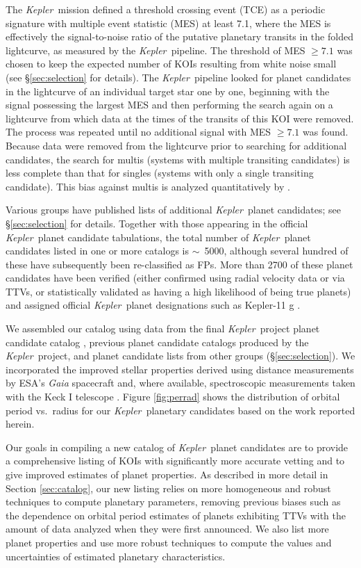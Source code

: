 \documentclass{aastex62}
\newcommand{\ik}{{\it Kepler~}}
\begin{document}
The \ik mission defined a threshold crossing event (TCE) as a periodic signature with multiple event statistic (MES) at least 7.1, where the MES is effectively the signal-to-noise ratio of the putative planetary transits in the folded lightcurve, as measured by the \ik pipeline. The threshold of MES $\geq 7.1$ was chosen to keep the expected number of KOIs resulting from white noise small (see \S\ref{sec:selection} for details). The \ik pipeline looked for planet candidates in the lightcurve of an individual target star one by one, beginning with the signal possessing the largest MES and then performing the search again on a lightcurve from which data at the times of the transits of this KOI were removed. The process was repeated until no additional signal with MES $\geq 7.1$ was found. Because data were removed from the lightcurve prior to searching for additional candidates, the search for multis (systems with multiple transiting candidates) is less complete than that for singles (systems with only a single transiting candidate). This bias against multis is analyzed quantitatively by \cite{Zink:2019}. 

Various groups have published lists of additional \ik planet candidates; see \S\ref{sec:selection} for details.
Together with those appearing in the official \ik planet candidate tabulations, the total number of \ik planet candidates listed in one or more catalogs is $\sim$~5000, although several hundred of these have subsequently been re-classified as FPs. More than 2700 of these planet candidates have been verified (either confirmed using radial velocity data or via TTVs, or statistically validated as having a high likelihood of being true planets) and assigned official \ik planet designations such as Kepler-11 g \citep{Lissauer:2011a}. 
 
 We assembled our catalog using data from the final \ik project planet candidate catalog \citep{Thompson:2018}, previous planet candidate catalogs produced by the \ik project, and planet candidate lists from other groups (\S\ref{sec:selection}). We incorporated the improved stellar properties derived using distance measurements by ESA's {\it Gaia} spacecraft \citep{Gaia:2018,Berger:2020a} and, where available, spectroscopic measurements taken with the Keck I telescope \citep{Petigura:2017,Fulton:2018}.  Figure \ref{fig:perrad} shows the distribution of orbital period vs.~radius for our \ik planetary candidates based on the work reported herein.
 
Our goals in compiling a new catalog of \ik planet candidates are to provide a comprehensive listing of KOIs with significantly more accurate vetting and to give improved estimates of planet properties. As described in more detail in Section \ref{sec:catalog}, our new listing relies on more homogeneous and robust techniques to compute planetary parameters, removing previous biases such as the dependence on orbital period estimates of planets exhibiting TTVs with the amount of data analyzed when they were first announced. We also list more planet properties and use more robust techniques to compute the values and uncertainties of estimated planetary characteristics.
\end{document}
